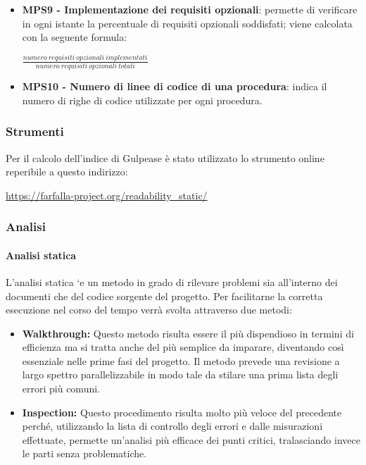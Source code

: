 \documentclass[11pt,a4paper]{article}
\begin{document}
{\begin{itemize}
	 
	 \item \textbf{MPS9 - Implementazione dei requisiti opzionali}: permette di verificare in ogni istante la percentuale di requisiti opzionali soddisfati; viene calcolata con la seguente formula: 
		\begin{center}
		$\frac{numero\ requisiti\ opzionali\ implementati}{numero\ requisiti\ opzionali\ totali}$
	\end{center}

	  \item \textbf{MPS10 - Numero di linee di codice di una procedura}: indica il numero di righe di codice utilizzate per ogni procedura.

	\end{itemize}
	
	\subsubsection{Strumenti}
	Per il calcolo dell'indice di Gulpease è stato utilizzato lo strumento online reperibile a questo indirizzo: \begin{center}
		\url{https://farfalla-project.org/readability_static/}
	\end{center}
	
	\subsubsection{Analisi}
	\paragraph{Analisi statica\\}
	L'analisi statica `e un metodo in grado di rilevare problemi sia all'interno dei documenti che del codice sorgente del progetto. Per facilitarne la corretta esecuzione nel corso del tempo verrà svolta attraverso due metodi:
\begin{itemize}
	\item\textbf{Walkthrough:} Questo metodo risulta essere il più dispendioso in termini di efficienza ma si tratta anche del più semplice da imparare, diventando così essenziale nelle prime fasi del progetto. Il  metodo  prevede  una  revisione  a  largo  spettro  parallelizzabile  in  modo  tale  da stilare una prima lista degli errori più comuni.
	\item \textbf{Inspection:} Questo procedimento risulta molto più veloce del precedente perché, utilizzando la lista di controllo degli errori e dalle misurazioni effettuate, permette un'analisi più efficace dei punti critici, tralasciando invece le parti senza problematiche.
	\end{itemize}
	
}
\end{document}
